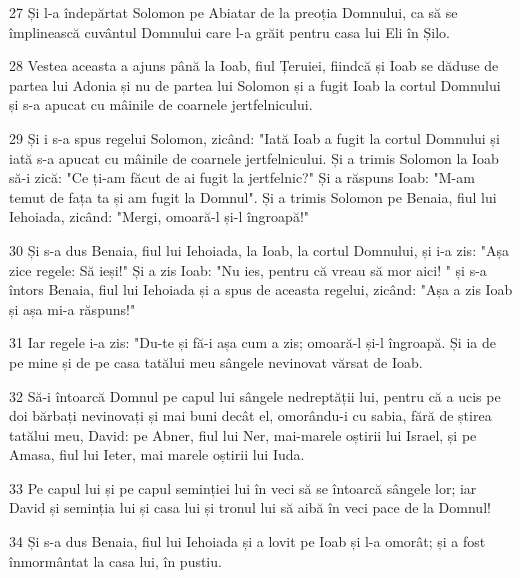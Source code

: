 \par 27 Și l-a îndepărtat Solomon pe Abiatar de la preoția Domnului, ca să se împlinească cuvântul Domnului care l-a grăit pentru casa lui Eli în Șilo.
\par 28 Vestea aceasta a ajuns până la Ioab, fiul Țeruiei, fiindcă și Ioab se dăduse de partea lui Adonia și nu de partea lui Solomon și a fugit Ioab la cortul Domnului și s-a apucat cu mâinile de coarnele jertfelnicului.
\par 29 Și i s-a spus regelui Solomon, zicând: "Iată Ioab a fugit la cortul Domnului și iată s-a apucat cu mâinile de coarnele jertfelnicului. Și a trimis Solomon la Ioab să-i zică: "Ce ți-am făcut de ai fugit la jertfelnic?" Și a răspuns Ioab: "M-am temut de fața ta și am fugit la Domnul". Și a trimis Solomon pe Benaia, fiul lui Iehoiada, zicând: "Mergi, omoară-l și-l îngroapă!"
\par 30 Și s-a dus Benaia, fiul lui Iehoiada, la Ioab, la cortul Domnului, și i-a zis: "Așa zice regele: Să ieși!" Și a zis Ioab: "Nu ies, pentru că vreau să mor aici! " și s-a întors Benaia, fiul lui Iehoiada și a spus de aceasta regelui, zicând: "Așa a zis Ioab și așa mi-a răspuns!"
\par 31 Iar regele i-a zis: "Du-te și fă-i așa cum a zis; omoară-l și-l îngroapă. Și ia de pe mine și de pe casa tatălui meu sângele nevinovat vărsat de Ioab.
\par 32 Să-i întoarcă Domnul pe capul lui sângele nedreptății lui, pentru că a ucis pe doi bărbați nevinovați și mai buni decât el, omorându-i cu sabia, fără de știrea tatălui meu, David: pe Abner, fiul lui Ner, mai-marele oștirii lui Israel, și pe Amasa, fiul lui Ieter, mai marele oștirii lui Iuda.
\par 33 Pe capul lui și pe capul seminției lui în veci să se întoarcă sângele lor; iar David și seminția lui și casa lui și tronul lui să aibă în veci pace de la Domnul!
\par 34 Și s-a dus Benaia, fiul lui Iehoiada și a lovit pe Ioab și l-a omorât; și a fost înmormântat la casa lui, în pustiu.
